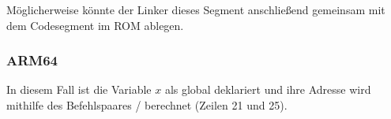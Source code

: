 Möglicherweise könnte der Linker dieses Segment anschließend gemeinsam mit dem Codesegment im ROM ablegen.

\subsubsection{ARM64}



In diesem Fall ist die Variable $x$ als global deklariert und ihre Adresse wird mithilfe des Befehlspaares
/ berechnet (Zeilen 21 und 25).

